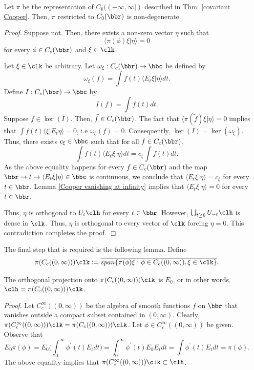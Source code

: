 \begin{lmma}
\label{non-degenerate Cooper}
Let $\pi$ be the representation of $C_0((-\infty,\infty])$ described in Thm. \ref{covariant Cooper}. Then, $\pi$ restricted to $C_{0}(\bbr)$ is non-degenerate. 
\end{lmma}
\textit{Proof.} Suppose not. Then, there exists a non-zero vector $\eta$ such that 
\[
\langle \pi(\phi)\xi|\eta\rangle=0\]
for every $\phi \in C_{c}(\bbr)$ and $\xi \in \clk$. 

Let $\xi \in \clk$ be arbitrary. Let $\omega_\xi:C_{c}(\bbr) \to \bbc$ be defined by 
\[
\omega_\xi(f)=\int f(t)\langle E_t\xi|\eta \rangle dt.\]
Define $I:C_{c}(\bbr) \to \bbc$ by \[I(f)=\int f(t)dt.\] Suppose $f \in \ker(I)$. Then, $\widetilde{f} \in C_{c}(\bbr)$. The fact that $\langle \pi(\widetilde{f})\xi|\eta \rangle=0$ implies that 
$\int f(t)\langle \xi|E_t\eta\rangle=0$, i.e $\omega_\xi(f)=0$. Consequently, $\ker(I)=\ker(\omega_\xi)$. Thus, there exists $c_{\xi} \in \bbc$ such that for all $f \in C_{c}(\bbr)$, 
\[
\int f(t)\langle E_t\xi|\eta \rangle dt=c_{\xi}\int f(t)dt.\]
As the above equality happens for every $f \in C_{c}(\bbr)$ and the map $\bbr \to t \to \langle E_t\xi|\eta \rangle \in \bbc$ is continuous, we conclude that $\langle E_t\xi|\eta\rangle =c_{\xi}$ for every $t \in \bbr$. 
Lemma \ref{Cooper vanishing at infinity} implies that $\langle E_t\xi|\eta \rangle=0$ for every $t \in \bbr$. 
 
 Thus, $\eta$ is orthogonal to $U_t\clh$ for every $t \in \bbr$. However, $\bigcup_{t \geq 0}U_{-t}\clh$ is dense in $\clk$. Thus, $\eta$ is orthogonal to every vector of $\clk$ forcing $\eta=0$. This contradiction
 completes the proof. \hfill $\Box$
 
 The final step that is required is the following lemma. Define
 \[
 \pi(C_{c}((0,\infty)))\clk:=\overline{span\{\pi(\phi)\xi:\phi \in C_{c}((0,\infty)), \xi \in \clk\}}.\]
 
 \begin{lmma}
 \label{projection onto the given space}
 The orthogonal projection onto $\pi(C_{c}((0,\infty)))\clk$ is $E_0$, or in other words, $\clh=\pi(C_{c}((0,\infty)))\clk$.  
  \end{lmma}
  \textit{Proof.} Let $C_{c}^{\infty}((0,\infty))$ be the algebra of smooth functions $f$ on $\bbr$ that vanishes outside a compact subset contained in $(0,\infty)$. Clearly, $\pi(C_{c}^{\infty}((0,\infty)))\clk=\pi(C_{c}((0,\infty)))\clk$. 
 Let $\phi \in C_{c}^{\infty}((0,\infty))$ be given. Observe that 
 \[
 E_0\pi(\phi)=E_0\Big(\int_{0}^{\infty}\phi^{'}(t)E_tdt\Big)=\int_{0}^{\infty} \phi^{'}(t)E_0E_tdt=\int \phi^{'}(t)E_tdt=\pi(\phi).\]
 The above equality implies that $\pi(C_{c}^{\infty}((0,\infty)))\clk \subset \clh$. 
 
